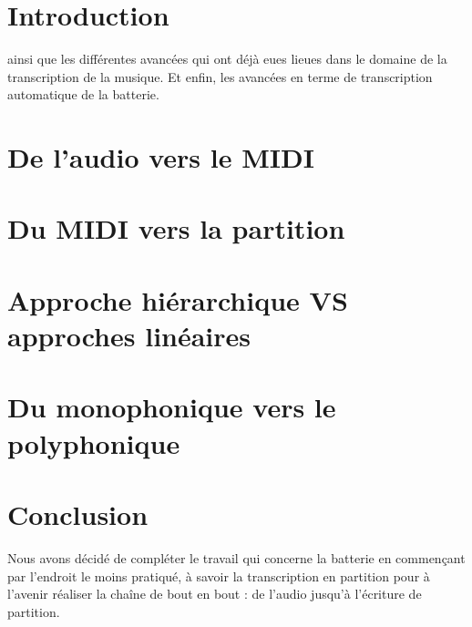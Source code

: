 \section{Introduction}
 ainsi que les différentes avancées qui ont déjà eues lieues dans le domaine de la transcription de la musique. Et enfin, les avancées en terme de transcription automatique de la batterie.
\section{De l’audio vers le MIDI}
\section{Du MIDI vers la partition}
\section{Approche hiérarchique VS approches linéaires}
\section{Du monophonique vers le polyphonique} 
\section{Conclusion}
Nous avons décidé de compléter le travail qui concerne la batterie en commençant par l’endroit le moins pratiqué, à savoir la transcription en partition pour à l’avenir réaliser la chaîne de bout en bout : de l’audio jusqu’à l’écriture de partition.